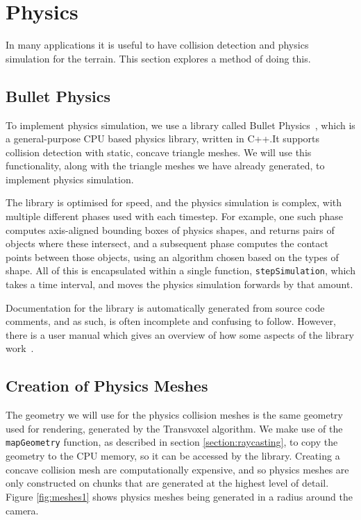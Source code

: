 \documentclass[11pt]{article}
\begin{document}
\section{Physics}
In many applications it is useful to have collision detection and physics simulation for the terrain. This section explores a method of doing this.
\subsection{Bullet Physics}
To implement physics simulation, we use a library called Bullet Physics~\cite{bullet-physics}, which is a general-purpose CPU based physics library, written in C++.It supports collision detection with static, concave triangle meshes. We will use this functionality, along with the triangle meshes we have already generated, to implement physics simulation.

The library is optimised for speed, and the physics simulation is complex, with multiple different phases used with each timestep. For example, one such phase computes axis-aligned bounding boxes of physics shapes, and returns pairs of objects where these intersect, and a subsequent phase computes the contact points between those objects, using an algorithm chosen based on the types of shape. All of this is encapsulated within a single function, \texttt{stepSimulation}, which takes a time interval, and moves the physics simulation forwards by that amount.

Documentation for the library is automatically generated from source code comments, and as such, is often incomplete and confusing to follow. However, there is a user manual which gives an overview of how some aspects of the library work~\cite{coumans_2015}.

\subsection{Creation of Physics Meshes}
\label{section:physics_meshes}
The geometry we will use for the physics collision meshes is the same geometry used for rendering, generated by the Transvoxel algorithm. We make use of the \texttt{mapGeometry} function, as described in section \ref{section:raycasting}, to copy the geometry to the CPU memory, so it can be accessed by the library.
Creating a concave collision mesh are computationally expensive, and so physics meshes are only constructed on chunks that are generated at the highest level of detail. Figure \ref{fig:meshes1} shows physics meshes being generated in a radius around the camera.
\end{document}
